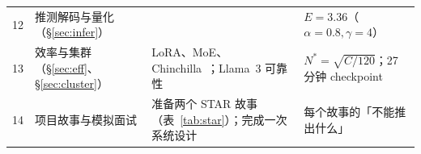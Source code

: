 \begin{table}[!t]
\begin{tabularx}{\textwidth}{@{}c L{3.0cm} Y L{4.2cm}@{}}
12 & 推测解码与量化（\S\ref{sec:infer}） & \cite{leviathan2023fast,dettmers2022llmint8,frantar2023gptq,lin2024awq} & $E=3.36$（$\alpha=0.8,\gamma=4$） \\
13 & 效率与集群（\S\ref{sec:eff}、\S\ref{sec:cluster}） & LoRA、MoE、Chinchilla~\cite{hoffmann2022training}；Llama~3 可靠性 & $N^\ast=\sqrt{C/120}$；27 分钟 checkpoint \\
14 & 项目故事与模拟面试 & 准备两个 STAR 故事（表~\ref{tab:star}）；完成一次系统设计 & 每个故事的「不能推出什么」 \\
\bottomrule
\end{tabularx}
\end{table}
